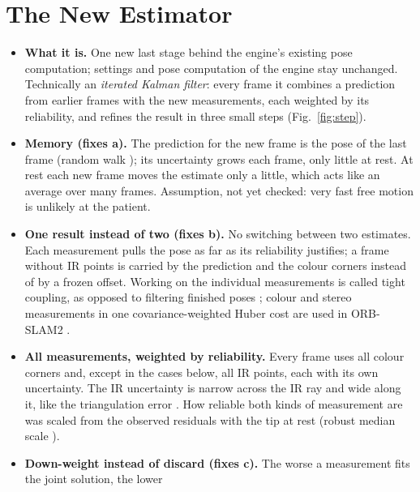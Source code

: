 \documentclass[11pt,a4paper,fleqn]{article}
\begin{document}
\section{The New Estimator}
\label{sec:new}

\begin{itemize}
  \item \textbf{What it is.} One new last stage behind the engine's existing pose computation; settings and pose
        computation of the engine stay unchanged. Technically an \emph{iterated Kalman filter}: every frame it
        combines a prediction from earlier frames with the new measurements, each weighted by its reliability, and
        refines the result in three small steps (Fig.~\ref{fig:step}).
  \item \textbf{Memory (fixes a).} The prediction for the new frame is the pose of the last frame (random walk
        \cite[Ex.~4.1, 4.2]{saerkkae2013bayesian}); its uncertainty grows each frame, only little at rest. At rest
        each new frame moves the estimate only a little, which acts like an average over many frames. Assumption,
        not yet checked: very fast free motion is unlikely at the patient.
  \item \textbf{One result instead of two (fixes b).} No switching between two estimates. Each measurement pulls the
        pose as far as its reliability justifies; a frame without IR points is carried by the prediction and the
        colour corners instead of by a frozen offset. Working on the individual measurements is called tight
        coupling, as opposed to filtering finished poses \cite[p.~493]{tobergte2009robust}; colour and stereo
        measurements in one covariance-weighted Huber cost are used in ORB-SLAM2
        \cite[Sec.~III-C]{murartal2017orbslam2}.
  \item \textbf{All measurements, weighted by reliability.} Every frame uses all colour corners and, except in the
        cases below, all IR points, each with its own uncertainty. The IR uncertainty is narrow across the IR ray
        and wide along it, like the triangulation error \cite[§II]{matthies1987error}. How reliable both kinds of
        measurement are was scaled from the observed residuals with the tip at rest (robust median scale
        \cite[Eq.~(28)]{zhang1997parameter}).
  \item \textbf{Down-weight instead of discard (fixes c).} The worse a measurement fits the joint solution, the lower

\end{itemize}
\end{document}
